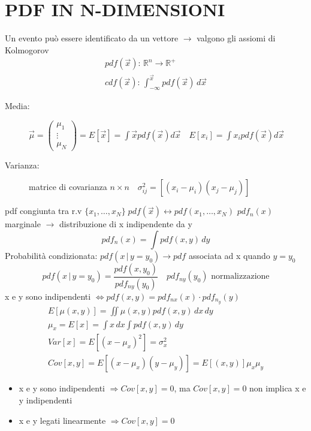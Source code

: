 \documentclass[12pt]{report}
\theoremstyle{remark}
\theoremstyle{theorem}
\begin{document}
\section{PDF IN N-DIMENSIONI}
Un evento può essere identificato da un vettore $\to$ valgono gli assiomi di Kolmogorov 
\begin{gather*}
	pdf(\vec{x}): \, \mathbb{R}^n \to \mathbb{R}^+ \\
	cdf(\vec{x}): \, \int_{-\infty}^{\vec{x}} pdf(\vec{x})\, d\vec{x}
\end{gather*}
\begin{description}
	\item[Media:] $\vec{\mu} = \left(
		\begin{array}{c}
			\mu_1 \\
			\vdots \\
			\mu_N
		\end{array} \right) = E[\vec{x}] = \int \vec{x}pdf(\vec{x})d\vec{x} \quad E[x_i] = \int x_ipdf(\vec{x})d\vec{x}$
	\item[Varianza:] matrice di covarianza $n\times n \quad \sigma^2_{ij} = [(x_i-\mu_i)(x_j-\mu_j)]$
\end{description}
pdf congiunta tra r.v $\{x_1,\dots, x_N\} \; pdf(\vec{x}) \leftrightarrow pdf(x_1, \dots, x_N)$ \newline
$pdf_n(x)$ marginale $\to$ distribuzione di x indipendente da y
\[pdf_n(x) = \int pdf(x,y)\, dy\]
Probabilità condizionata: $pdf(x\,|\, y=y_0) \to pdf$ associata ad x quando $y=y_0$
\[pdf(x\,|\, y=y_0) = \frac{pdf(x,y_0)}{pdf_{ny}(y_0)} \quad pdf_{ny}(y_0)\text{ normalizzazione}\]
x e y sono indipendenti $\iff pdf(x,y) = pdf_{nx}(x)\cdot pdf_{n_y}(y)$ 
\begin{gather*}
	E[\mu(x,y)] = \iint \mu(x,y)pdf(x,y) \, dx\,dy \\
	\mu_x= E[x] = \int x\,dx \int pdf(x,y) \, dy \\
	Var[x] = E[{(x-\mu_x)}^2] = \sigma^2_x \\
	Cov[x,y] = E[(x-\mu_x)(y-\mu_y)] = E[(x,y)]\mu_x\mu_y
\end{gather*}
\begin{itemize}
	\item x e y sono indipendenti $\Rightarrow Cov[x,y] = 0$, ma $Cov[x,y]=0$ non implica x e y indipendenti
 \item x e y legati linearmente $\Rightarrow Cov[x,y] =0$
\end{itemize}
\end{document}
